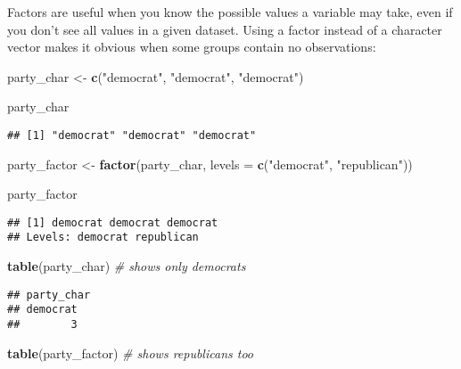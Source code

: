 \documentclass[
]{book}
\newenvironment{Shaded}{\begin{snugshade}}{\end{snugshade}}
\newcommand{\CommentTok}[1]{\textcolor[rgb]{0.56,0.35,0.01}{\textit{#1}}}
\newcommand{\DataTypeTok}[1]{\textcolor[rgb]{0.13,0.29,0.53}{#1}}
\newcommand{\KeywordTok}[1]{\textcolor[rgb]{0.13,0.29,0.53}{\textbf{#1}}}
\newcommand{\NormalTok}[1]{#1}
\newcommand{\StringTok}[1]{\textcolor[rgb]{0.31,0.60,0.02}{#1}}
\begin{document}
Factors are useful when you know the possible values a variable may take, even if you don't see all values in a given dataset. Using a factor instead of a character vector makes it obvious when some groups contain no observations:

\begin{Shaded}
\begin{Highlighting}[]
\NormalTok{party\_char \textless{}{-}}\StringTok{ }\KeywordTok{c}\NormalTok{(}\StringTok{"democrat"}\NormalTok{, }\StringTok{"democrat"}\NormalTok{, }\StringTok{"democrat"}\NormalTok{)}

\NormalTok{party\_char}
\end{Highlighting}
\end{Shaded}

\begin{verbatim}
## [1] "democrat" "democrat" "democrat"
\end{verbatim}

\begin{Shaded}
\begin{Highlighting}[]
\NormalTok{party\_factor \textless{}{-}}\StringTok{ }\KeywordTok{factor}\NormalTok{(party\_char, }\DataTypeTok{levels =} \KeywordTok{c}\NormalTok{(}\StringTok{"democrat"}\NormalTok{, }\StringTok{"republican"}\NormalTok{))}

\NormalTok{party\_factor}
\end{Highlighting}
\end{Shaded}

\begin{verbatim}
## [1] democrat democrat democrat
## Levels: democrat republican
\end{verbatim}

\begin{Shaded}
\begin{Highlighting}[]
\KeywordTok{table}\NormalTok{(party\_char) }\CommentTok{\# shows only democrats}
\end{Highlighting}
\end{Shaded}

\begin{verbatim}
## party_char
## democrat 
##        3
\end{verbatim}

\begin{Shaded}
\begin{Highlighting}[]
\KeywordTok{table}\NormalTok{(party\_factor) }\CommentTok{\# shows republicans too}
\end{Highlighting}
\end{Shaded}
\end{document}
